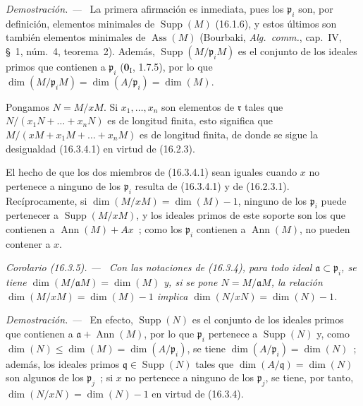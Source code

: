 \documentclass[10pt,oneside]{book}
\makeatletter
\newcommand{\setmanualcurrentlabel}[1]{\def\@currentlabel{#1}}
\newcommand{\oldpage}[2][]{%
  \setcounter{footnote}{0}%
  \marginpar{\scriptsize\textbf{#1}~|~#2}\ignorespaces}
\newenvironment{corollary}[1][]{%
  \setmanualcurrentlabel{#1}\par\medskip\noindent\itshape Corolario (#1). ---\ }{\par}
\newenvironment{proof}{%
  \par\medskip\noindent\textit{Demostración. ---\ }}{\par}
\providecommand{\setmin}{-}%
\makeatother
\begin{document}
\begin{proof}
La primera afirmación es inmediata, pues los $\mathfrak{p}_i$ son, por
definición, elementos minimales de $\operatorname{Supp}(M)$ (16.1.6), y estos
últimos son también elementos minimales de $\operatorname{Ass}(M)$ (Bourbaki,
\emph{Alg.~comm.}, cap.~IV, \S~1, núm.~4, teorema~2). Además,
$\operatorname{Supp}(M/\mathfrak{p}_iM)$ es el conjunto de los ideales primos
que contienen a $\mathfrak{p}_i$ ($\mathbf{0}_{\mathrm I}$, 1.7.5), por lo que
$\dim(M/\mathfrak{p}_iM)=\dim(A/\mathfrak{p}_i)=\dim(M)$.

Pongamos $N=M/xM$. Si $x_1,\ldots,x_n$ son elementos de $\mathfrak{r}$ tales
que $N/(x_1N+\ldots+x_nN)$ es de longitud finita, esto significa que
$M/(xM+x_1M+\ldots+x_nM)$ es de longitud finita, de donde se sigue la
desigualdad (16.3.4.1) en virtud de (16.2.3).

El hecho de que los dos miembros de (16.3.4.1) sean iguales cuando $x$ no
pertenece a ninguno de los $\mathfrak{p}_i$ resulta de (16.3.4.1) y de
(16.2.3.1). Recíprocamente, si
\oldpage[0\textsubscript{IV-1}]{30}
$\dim(M/xM)=\dim(M)\setmin 1$, ninguno de los $\mathfrak{p}_i$ puede pertenecer a
$\operatorname{Supp}(M/xM)$, y los ideales primos de este soporte son los que
contienen a $\operatorname{Ann}(M)+Ax$~; como los $\mathfrak{p}_i$ contienen a
$\operatorname{Ann}(M)$, no pueden contener a $x$.
\end{proof}

\begin{corollary}[16.3.5]
\label{0.16.3.5-es}
Con las notaciones de \textup{(16.3.4)}, para todo ideal
$\mathfrak{a}\subset\mathfrak{p}_i$, se tiene
$\dim(M/\mathfrak{a}M)=\dim(M)$ y, si se pone
$N=M/\mathfrak{a}M$, la relación $\dim(M/xM)=\dim(M)\setmin 1$ implica
$\dim(N/xN)=\dim(N)\setmin 1$.
\end{corollary}

\begin{proof}
En efecto, $\operatorname{Supp}(N)$ es el conjunto de los ideales primos que
contienen a $\mathfrak{a}+\operatorname{Ann}(M)$, por lo que $\mathfrak{p}_i$
pertenece a $\operatorname{Supp}(N)$ y, como
$\dim(N)\leq\dim(M)=\dim(A/\mathfrak{p}_i)$, se tiene
$\dim(A/\mathfrak{p}_i)=\dim(N)$~; además, los ideales primos
$\mathfrak{q}\in\operatorname{Supp}(N)$ tales que
$\dim(A/\mathfrak{q})=\dim(N)$ son algunos de los $\mathfrak{p}_j$~; si $x$
no pertenece a ninguno de los $\mathfrak{p}_j$, se tiene, por tanto,
$\dim(N/xN)=\dim(N)\setmin 1$ en virtud de (16.3.4).
\end{proof}
\end{document}
